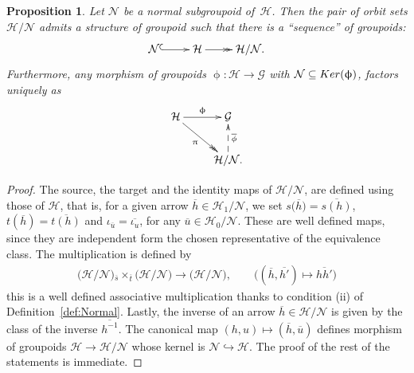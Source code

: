 \documentclass[11pt]{article}
\numberwithin{equation}{section}
\newtheorem{Proposition}[Theorem]{Proposition}
 { \theoremstyle{definition}
\newtheorem{Definition}[Theorem]{Definition}
\newtheorem{Remark}[Theorem]{Remark}
\newtheorem{Example}[Theorem]{Example}
 }
\newcommand{\bara}[1]{\overline{#1}}
\newcommand{\Ho}{\cH_{\Sscript{0}}}
\newcommand{\Ker}[1]{{\rm Ker}(#1)}
\newcommand{\cG}{{\mathcal G}}
\newcommand{\cH}{{\mathcal H}}
\newcommand{\cN}{{\mathcal N}}
\newcommand{\Sscript}[1]{\scriptscriptstyle{#1}}
\newcommand{\due}[3]{{}_{{#2 }} {#1}_{{ #3}} }
\begin{document}
\begin{Proposition}\label{prop:quotient}Let $\cN$ be a normal subgroupoid of~$\cH$. Then the pair of orbit sets $\cH/\cN$ admits a structure of groupoid such that there is a ``sequence'' of groupoids:
\begin{gather*}
\xymatrix{\cN \ar@{^{(}->}[r] & \cH \ar@{->>}[r] & \cH/\cN.}
\end{gather*}
Furthermore, any morphism of groupoids $\upphi\colon \cH \to \cG$ with $\cN \subseteq \Ker{\upphi} $, factors uniquely as
\begin{gather*}
\xymatrix{ \cH \ar@{->}^-{\upphi}[r] \ar@{->>}_-{\uppi}[rd] & \cG
\\ & \cH/\cN. \ar@{-->}_-{\bara{\phi}}[u]. }
\end{gather*}
\end{Proposition}
\begin{proof}The source, the target and the identity maps of $\cH/\cN$, are defined using those of $\cH$, that is, for a given arrow $\bara{h} \in \cH_{\Sscript{1}}/\cN$, we set $s\big(\bara{h}\big)=\bara{s(h)}$, $t(\bara{h})=\bara{t(h)}$ and $\iota_{\bara {\Sscript{u}}}=\bara{\iota_{\Sscript{u}}}$, for any $\bara{u} \in \Ho/\cN$. These are well defined maps, since they are independent form the chosen representative of the equivalence class. The multiplication is defined by
\begin{gather*}
\big(\cH/\cN\big) \due \times { \Sscript{\bara{s}}} {\Sscript{\bara{t}}} \big(\cH/\cN\big) \longrightarrow\big(\cH/\cN\big), \qquad \big( (\bara{h}, \bara{h'}) \longmapsto \bara{hh'} \big)
\end{gather*}
this is a well defined associative multiplication thanks to condition (ii) of Definition~\ref{def:Normal}. Lastly, the inverse of an arrow $\bara{h} \in \cH/\cN$ is given by the class of the inverse $\bara{h^{-1}}$. The canonical map $(h,u) \mapsto (\bara{h}, \bara{u})$ defines morphism of groupoids $\cH \to \cH/\cN$ whose kernel is $\cN \hookrightarrow \cH$. The proof of the rest of the statements is immediate.
\end{proof}
\end{document}

